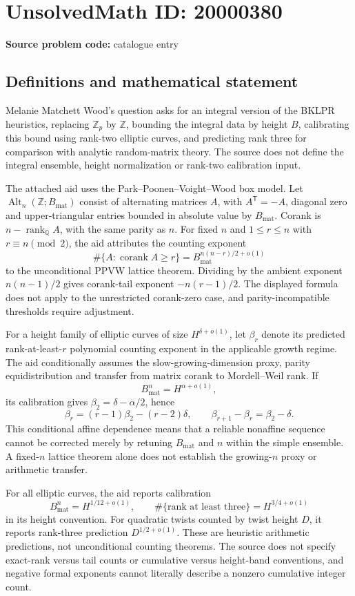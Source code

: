 \documentclass[11pt]{article}
\newcommand{\Z}{\mathbb{Z}}
\newcommand{\Q}{\mathbb{Q}}
\begin{document}
\section*{UnsolvedMath ID: 20000380}
\textbf{Source problem code:} catalogue entry
\subsection{Definitions and mathematical statement}
Melanie Matchett Wood's question asks for an integral version of the BKLPR heuristics, replacing \(\Z_p\) by \(\Z\), bounding the integral data by height \(B\), calibrating this bound using rank-two elliptic curves, and predicting rank three for comparison with analytic random-matrix theory. The source does not define the integral ensemble, height normalization or rank-two calibration input.

The attached aid uses the Park--Poonen--Voight--Wood box model. Let \(\operatorname{Alt}_n(\Z;B_{\mathrm{mat}})\) consist of alternating matrices \(A\), with \(A^{\mathsf T}=-A\), diagonal zero and upper-triangular entries bounded in absolute value by \(B_{\mathrm{mat}}\). Corank is \(n-\operatorname{rank}_{\Q}A\), with the same parity as \(n\). For fixed \(n\) and \(1\leq r\leq n\) with \(r\equiv n\pmod2\), the aid attributes the counting exponent
\[
\#\{A:\operatorname{corank}A\geq r\}
=B_{\mathrm{mat}}^{n(n-r)/2+o(1)}
\]
to the unconditional PPVW lattice theorem. Dividing by the ambient exponent \(n(n-1)/2\) gives corank-tail exponent \(-n(r-1)/2\). The displayed formula does not apply to the unrestricted corank-zero case, and parity-incompatible thresholds require adjustment.

For a height family of elliptic curves of size \(H^{\delta+o(1)}\), let \(\beta_r\) denote its predicted rank-at-least-\(r\) polynomial counting exponent in the applicable growth regime. The aid conditionally assumes the slow-growing-dimension proxy, parity equidistribution and transfer from matrix corank to Mordell--Weil rank. If
\[
B_{\mathrm{mat}}^n=H^{\alpha+o(1)},
\]
its calibration gives \(\beta_2=\delta-\alpha/2\), hence
\[
\beta_r=(r-1)\beta_2-(r-2)\delta,
\qquad\beta_{r+1}-\beta_r=\beta_2-\delta.
\]
This conditional affine dependence means that a reliable nonaffine sequence cannot be corrected merely by retuning \(B_{\mathrm{mat}}\) and \(n\) within the simple ensemble. A fixed-\(n\) lattice theorem alone does not establish the growing-\(n\) proxy or arithmetic transfer.

For all elliptic curves, the aid reports calibration
\[
B_{\mathrm{mat}}^n=H^{1/12+o(1)},\qquad
\#\{\text{rank at least three}\}=H^{3/4+o(1)}
\]
in its height convention. For quadratic twists counted by twist height \(D\), it reports rank-three prediction \(D^{1/2+o(1)}\). These are heuristic arithmetic predictions, not unconditional counting theorems. The source does not specify exact-rank versus tail counts or cumulative versus height-band conventions, and negative formal exponents cannot literally describe a nonzero cumulative integer count.
\end{document}
